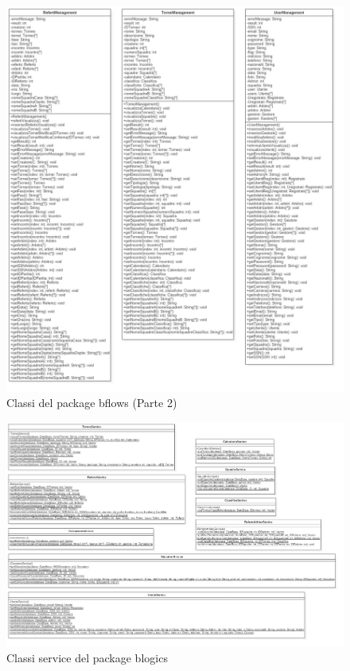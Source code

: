 	\begin{figure}[h]
		\centering
		\includegraphics[width=1\textwidth]
		{immagini/c-bflows-p2}
		
		\caption{Classi del package bflows (Parte 2)}
		\label{c-bflows-p2}
	\end{figure}
	
	\clearpage
	
	\begin{figure}[h]
		\centering
		\includegraphics[width=1\textwidth]
		{immagini/c-service-blogics}
		
		\caption{Classi service del package blogics}
		\label{c-service-blogics}
	\end{figure}
	
